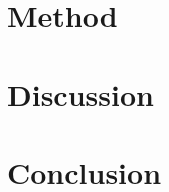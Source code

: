 \documentclass{article} %
\begin{document}
\section*{Method}

\section*{Discussion}


\section*{Conclusion}


\newpage



\end{document}
